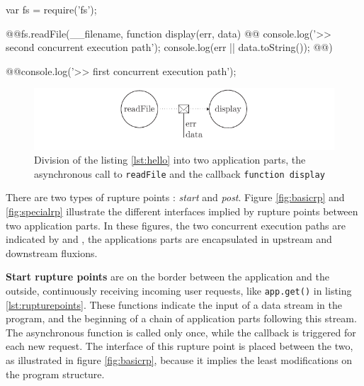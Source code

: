 \begin{code}[js, caption={Example of a rupture point : an asynchronous function call, \texttt{fs.readFile()}, with a callback parameter, \texttt{function display}},label={lst:hello}]
var fs = require('fs');

@\label{lst:callback_begin}@fs.readFile(__filename, function display(err, data) {
@\label{lst:second_ep}@  console.log('>> second concurrent execution path');
  console.log(err || data.toString());
@\label{lst:callback_end}@})

@\label{lst:first_ep}@console.log('>> first concurrent execution path');
\end{code}

\begin{figure}[h!]
\begin{center}
  \includegraphics[width=\linewidth]{ressources/flux-1.pdf}
  \caption{Division of the listing \ref{lst:hello} into two application parts, the asynchronous call to \texttt{readFile} and the callback \texttt{function display}}
  \label{fig:flux-1}
\end{center}
\end{figure}

There are two types of rupture points : \textit{start} and \textit{post}.
Figure \ref{fig:basicrp} and \ref{fig:specialrp} illustrate the different interfaces implied by rupture points between two application parts.
In these figures, the two concurrent execution paths are indicated by  and , the applications parts are encapsulated in upstream and downstream fluxions.

\textbf{Start rupture points} are on the border between the application and the outside, continuously receiving incoming user requests, like \texttt{app.get()} in listing \ref{lst:rupturepoints}.
These functions indicate the input of a data stream in the program, and the beginning of a chain of application parts following this stream.
The asynchronous function is called only once, while the callback is triggered for each new request.
The interface of this rupture point is placed between the two, as illustrated in figure \ref{fig:basicrp}, because it implies the least modifications on the program structure.

